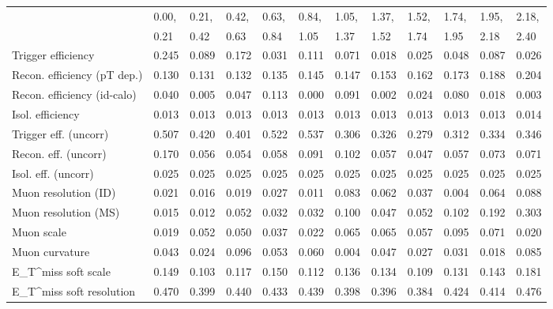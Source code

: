 \begin{tabular}{l|p{0.6cm}p{0.6cm}p{0.6cm}p{0.6cm}p{0.6cm}p{0.6cm}p{0.6cm}p{0.6cm}p{0.6cm}p{0.6cm}p{0.6cm}}
\hline
   & 0.00, & 0.21, & 0.42, & 0.63, & 0.84, & 1.05, & 1.37, & 1.52, & 1.74, & 1.95, & 2.18,  \\ 
   & 0.21 & 0.42 & 0.63 & 0.84 & 1.05 & 1.37 & 1.52 & 1.74 & 1.95 & 2.18 & 2.40  \\ 
\hline
Trigger efficiency                       & 0.245 & 0.089 & 0.172 & 0.031 & 0.111 & 0.071 & 0.018 & 0.025 & 0.048 & 0.087 & 0.026 \\
Recon. efficiency (pT dep.)              & 0.130 & 0.131 & 0.132 & 0.135 & 0.145 & 0.147 & 0.153 & 0.162 & 0.173 & 0.188 & 0.204 \\
Recon. efficiency (id-calo)              & 0.040 & 0.005 & 0.047 & 0.113 & 0.000 & 0.091 & 0.002 & 0.024 & 0.080 & 0.018 & 0.003 \\
Isol. efficiency                         & 0.013 & 0.013 & 0.013 & 0.013 & 0.013 & 0.013 & 0.013 & 0.013 & 0.013 & 0.013 & 0.014 \\
Trigger eff. (uncorr)                    & 0.507 & 0.420 & 0.401 & 0.522 & 0.537 & 0.306 & 0.326 & 0.279 & 0.312 & 0.334 & 0.346 \\
Recon. eff. (uncorr)                     & 0.170 & 0.056 & 0.054 & 0.058 & 0.091 & 0.102 & 0.057 & 0.047 & 0.057 & 0.073 & 0.071 \\
Isol. eff. (uncorr)                      & 0.025 & 0.025 & 0.025 & 0.025 & 0.025 & 0.025 & 0.025 & 0.025 & 0.025 & 0.025 & 0.025 \\
Muon resolution (ID)                     & 0.021 & 0.016 & 0.019 & 0.027 & 0.011 & 0.083 & 0.062 & 0.037 & 0.004 & 0.064 & 0.088 \\
Muon resolution (MS)                     & 0.015 & 0.012 & 0.052 & 0.032 & 0.032 & 0.100 & 0.047 & 0.052 & 0.102 & 0.192 & 0.303 \\
Muon scale                               & 0.019 & 0.052 & 0.050 & 0.037 & 0.022 & 0.065 & 0.065 & 0.057 & 0.095 & 0.071 & 0.020 \\
Muon curvature                           & 0.043 & 0.024 & 0.096 & 0.053 & 0.060 & 0.004 & 0.047 & 0.027 & 0.031 & 0.018 & 0.085 \\
E_{T}^{miss} soft scale                  & 0.149 & 0.103 & 0.117 & 0.150 & 0.112 & 0.136 & 0.134 & 0.109 & 0.131 & 0.143 & 0.181 \\
E_{T}^{miss} soft resolution             & 0.470 & 0.399 & 0.440 & 0.433 & 0.439 & 0.398 & 0.396 & 0.384 & 0.424 & 0.414 & 0.476 \\

\end{tabular}
